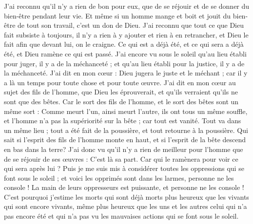 \begin{multicols}{2}
J'ai reconnu qu'il n'y a rien de bon pour eux, que de se réjouir et de se donner du bien-être pendant leur vie.
Et même si un homme mange et boit et jouit du bien-être de tout son travail, c'est un don de Dieu.
J'ai reconnu que tout ce que Dieu fait subsiste à toujours, il n’y a rien à y ajouter et rien à en retrancher, et Dieu le fait afin que devant lui, on le craigne.
Ce qui est a déjà été, et ce qui sera a déjà été, et Dieu ramène ce qui est passé.
J'ai encore vu sous le soleil qu'au lieu établi pour juger, il y a de la méchanceté ; et qu'au lieu établi pour la justice, il y a de la méchanceté.
J'ai dit en mon cœur : Dieu jugera le juste et le méchant ; car il y a là un temps pour toute chose et pour toute œuvre.
J'ai dit en mon cœur au sujet des fils de l’homme, que Dieu les éprouverait, et qu'ils verraient qu'ils ne sont que des bêtes.
Car le sort des fils de l’homme, et le sort des bêtes sont un même sort : Comme meurt l'un, ainsi meurt l'autre, ils ont tous un même souffle, et l'homme n'a pas la supériorité sur la bête ; car tout est vanité.
Tout va dans un même lieu ; tout a été fait de la poussière, et tout retourne à la poussière.
Qui sait si l’esprit des fils de l’homme monte en haut, et si l’esprit de la bête descend en bas dans la terre?
J'ai donc vu qu'il n'y a rien de meilleur pour l'homme que de se réjouir de ses œuvres : C'est là sa part. Car qui le ramènera pour voir ce qui sera après lui ?
\VerseOne{}Puis je me suis mis à considérer toutes les oppressions qui se font sous le soleil ; et voici les opprimés sont dans les larmes, personne ne les console ! La main de leurs oppresseurs est puissante, et personne ne les console !
C'est pourquoi j'estime les morts qui sont déjà morts plus heureux que les vivants qui sont encore vivants,
même plus heureux que les uns et les autres celui qui n’a pas encore été et qui n'a pas vu les mauvaises actions qui se font sous le soleil.

\end{multicols}
